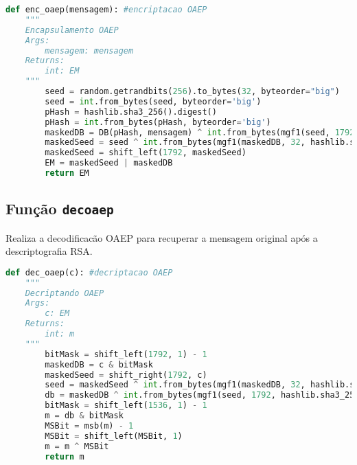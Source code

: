 \documentclass{article}
\begin{document}
\begin{lstlisting}[language=Python]
    def enc_oaep(mensagem): #encriptacao OAEP
    """
    Encapsulamento OAEP
    Args:
        mensagem: mensagem
    Returns:
        int: EM
    """
        seed = random.getrandbits(256).to_bytes(32, byteorder="big")                                # gera uma seed aleatoria
        seed = int.from_bytes(seed, byteorder='big')                                                # converte a seed para int
        pHash = hashlib.sha3_256().digest()                                                         # hash de NULL
        pHash = int.from_bytes(pHash, byteorder='big')                                              # converte o hash da seed para int
        maskedDB = DB(pHash, mensagem) ^ int.from_bytes(mgf1(seed, 1792, hashlib.sha3_256))         # faz a concatenacao de pHash e mensagem
        maskedSeed = seed ^ int.from_bytes(mgf1(maskedDB, 32, hashlib.sha3_256))                    # faz a mascara da seed
        maskedSeed = shift_left(1792, maskedSeed)                                                   # desloca a seed para a esquerda em 1792 bits
        EM = maskedSeed | maskedDB                                                                  # concatena a mascara da seed e a mascara da mensagem
        return EM
    \end{lstlisting}

\subsection{Função \texttt{dec\textunderscore oaep}}
Realiza a decodificacão OAEP para recuperar a mensagem original após a descriptografia RSA.

\begin{lstlisting}[language=Python]
    def dec_oaep(c): #decriptacao OAEP
    """
    Decriptando OAEP
    Args:
        c: EM
    Returns:
        int: m
    """
        bitMask = shift_left(1792, 1) - 1                                                           # mascara de bits
        maskedDB = c & bitMask
        maskedSeed = shift_right(1792, c)                                                                      # mascara de DB
        seed = maskedSeed ^ int.from_bytes(mgf1(maskedDB, 32, hashlib.sha3_256), byteorder='big')   #
        db = maskedDB ^ int.from_bytes(mgf1(seed, 1792, hashlib.sha3_256), byteorder='big')         #      
        bitMask = shift_left(1536, 1) - 1                                                           #
        m = db & bitMask                                                                            #
        MSBit = msb(m) - 1                                                                          #
        MSBit = shift_left(MSBit, 1)                                                                #
        m = m ^ MSBit                                                                               #
        return m
    \end{lstlisting}
\end{document}
